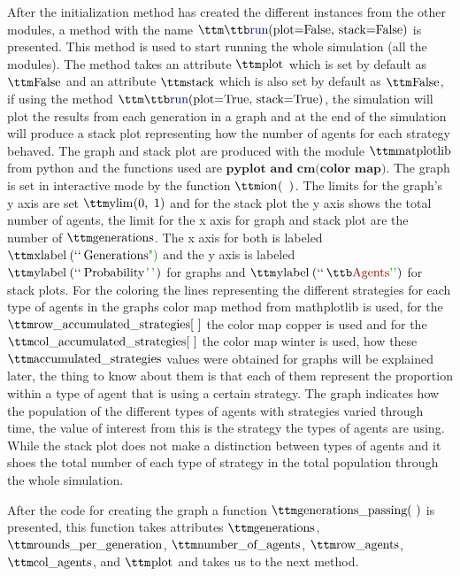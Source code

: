 After the initialization method has created the different instances from the other modules, a method with the name $\pythoninline{run(plot=False, stack=False)}$ is presented. This method is used to start running the whole simulation (all the modules). The method takes an attribute $\pythoninline{plot}$ which is set by default as $\pythoninline{False}$ and an attribute $\pythoninline{stack}$ which is also set by default as $\pythoninline{False}$, if using the method $\pythoninline{run(plot=True, stack=True)}$, the simulation will plot the results from each generation in a graph and at the end of the simulation will produce a stack plot representing how the number of agents for each strategy behaved. The graph and stack plot are produced with the module $\pythoninline{matplotlib}$ from python and the functions used are $\textbf{pyplot and cm(color map)}$. The graph is set in interactive mode by the function $\pythoninline{ion( )}$. The limits for the graph's y axis are set $\pythoninline{ylim(0, 1)}$ and for the stack plot the y axis shows the total number of agents, the limit for the x axis for graph and stack plot are the number of $\pythoninline{generations}$. The x axis for both is labeled $\pythoninline{xlabel(``Generations")}$ and the y axis is labeled $\pythoninline{ylabel(``Probability'')}$ for graphs and $\pythoninline{ylabel(``Agents'')}$ for stack plots. For the coloring the lines representing the different strategies for each type of agents in the graphs color map method from mathplotlib is used, for the $\pythoninline{row\_accumulated\_strategies[ ]}$ the color map copper is used and for the $\pythoninline{col\_accumulated\_strategies[ ]}$ the color map winter is used, how these $\pythoninline{accumulated\_strategies}$ values were obtained for graphs will be explained later, the thing to know about them is that each of them represent the proportion within a type of agent that is using a certain strategy. The graph indicates how the population of the different types of agents with strategies varied through time, the value of interest from this is the strategy the types of agents are using. While the stack plot does not make a distinction between types of agents and it shoes the total number of each type of strategy in the total population through the whole simulation.

After the code for creating the graph a function $\pythoninline{generations\_passing( )}$ is presented, this function takes attributes $\pythoninline{generations}$, $\pythoninline{rounds\_per\_generation}$, $\pythoninline{number\_of\_agents}$, $\pythoninline{row\_agents}$, $\pythoninline{col\_agents}$, and $\pythoninline{plot}$ and takes us to the next method.

